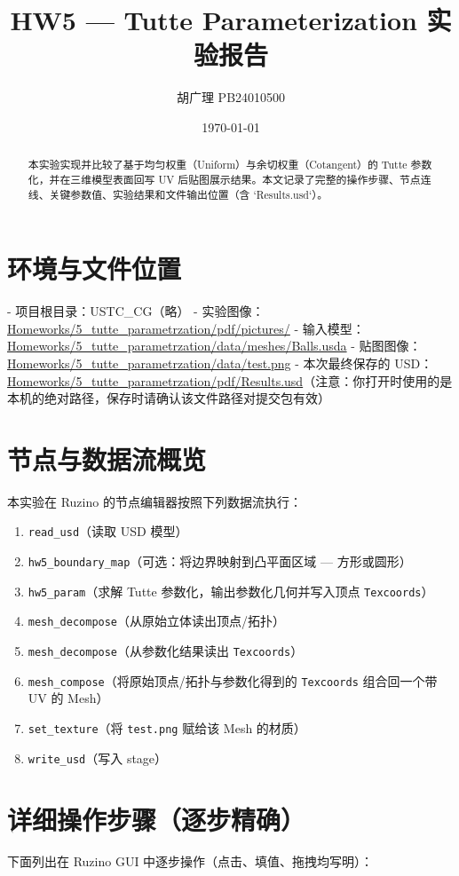 \documentclass[11pt,a4paper]{article}
\title{HW5 — Tutte Parameterization 实验报告}
\author{胡广理  PB24010500}
\date{\today}
\begin{document}
\maketitle
\begin{abstract}
本实验实现并比较了基于均匀权重（Uniform）与余切权重（Cotangent）的 Tutte 参数化，并在三维模型表面回写 UV 后贴图展示结果。本文记录了完整的操作步骤、节点连线、关键参数值、实验结果和文件输出位置（含 `Results.usd`）。
\end{abstract}

\section{环境与文件位置}
- 项目根目录：USTC\_CG（略）
- 实验图像：\url{Homeworks/5_tutte_parametrzation/pdf/pictures/}
- 输入模型：\url{Homeworks/5_tutte_parametrzation/data/meshes/Balls.usda}
- 贴图图像：\url{Homeworks/5_tutte_parametrzation/data/test.png}
- 本次最终保存的 USD：\url{Homeworks/5_tutte_parametrzation/pdf/Results.usd}（注意：你打开时使用的是本机的绝对路径，保存时请确认该文件路径对提交包有效）

\section{节点与数据流概览}
本实验在 Ruzino 的节点编辑器按照下列数据流执行：
\begin{enumerate}
  \item \verb|read_usd|（读取 USD 模型）
  \item \verb|hw5_boundary_map|（可选：将边界映射到凸平面区域 — 方形或圆形）
  \item \verb|hw5_param|（求解 Tutte 参数化，输出参数化几何并写入顶点 \verb|Texcoords|）
  \item \verb|mesh_decompose|（从原始立体读出顶点/拓扑）
  \item \verb|mesh_decompose|（从参数化结果读出 \verb|Texcoords|）
  \item \verb|mesh_compose|（将原始顶点/拓扑与参数化得到的 \verb|Texcoords| 组合回一个带 UV 的 Mesh）
  \item \verb|set_texture|（将 \texttt{test.png} 赋给该 Mesh 的材质）
  \item \verb|write_usd|（写入 stage）
\end{enumerate}

\section{详细操作步骤（逐步精确）}
下面列出在 Ruzino GUI 中逐步操作（点击、填值、拖拽均写明）：
\end{document}
